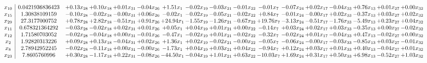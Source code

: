 \documentclass[9pt]{article}
\begin{document}
 \[\begin{array}{c| c c@{\hskip 2pt} c@{\hskip 2pt} c@{\hskip 2pt} c@{\hskip 2pt} c@{\hskip 2pt} c@{\hskip 2pt} c@{\hskip 2pt} c@{\hskip 2pt} c@{\hskip 2pt} c@{\hskip 2pt} c@{\hskip 2pt} c@{\hskip 2pt} c@{\hskip 2pt} c@{\hskip 2pt} c@{\hskip 2pt} }
 x_{10}   &  0.0421936836423 & +  0.13 x_{28} & +  0.10 x_{18} & +  0.01 x_{31} & -0.04 x_{26} & +  1.51 x_{1} & -0.02 x_{19} & -0.03 x_{21} & -0.01 x_{22} & -0.01 x_{7} & -0.07 x_{24} & +  0.02 x_{17} & -0.04 x_{33} & +  0.76 x_{13} & +  0.01 x_{27} & +  0.00 x_{32}\\
 x_{15}   &  1.30838109159 & -0.10 x_{28} & -0.02 x_{18} & -0.00 x_{31} & +  0.06 x_{26} & -0.02 x_{1} & -0.02 x_{19} & -0.05 x_{21} & -0.02 x_{22} & +  0.84 x_{7} & -0.01 x_{24} & -0.00 x_{17} & +  0.02 x_{33} & -0.37 x_{13} & +  0.03 x_{27} & +  0.02 x_{32}\\
 x_{29}   &  27.3177000752 & +  0.78 x_{28} & +  2.82 x_{18} & -0.51 x_{31} & +  0.91 x_{26} & + 24.94 x_{1} & -1.55 x_{19} & -1.26 x_{21} & -0.67 x_{22} & + 19.76 x_{7} & -3.13 x_{24} & -0.51 x_{17} & -1.76 x_{33} & -5.49 x_{13} & +  0.23 x_{27} & +  0.04 x_{32}\\
 x_{11}   &  0.678321364292 & -0.03 x_{28} & -0.02 x_{18} & +  0.02 x_{31} & +  0.01 x_{26} & +  0.05 x_{1} & +  0.04 x_{19} & +  0.01 x_{21} & +  0.00 x_{22} & -0.14 x_{7} & +  0.03 x_{24} & +  0.02 x_{17} & +  0.03 x_{33} & -0.35 x_{13} & +  0.00 x_{27} & -0.02 x_{32}\\
 x_{12}   &  1.71580703052 & -0.02 x_{28} & -0.04 x_{18} & +  0.00 x_{31} & -0.01 x_{26} & -0.47 x_{1} & -0.02 x_{19} & +  0.01 x_{21} & -0.02 x_{22} & -0.32 x_{7} & -0.02 x_{24} & +  0.01 x_{17} & -0.04 x_{33} & +  0.47 x_{13} & -0.02 x_{27} & +  0.00 x_{32}\\
 x_{2}   &  1.92820313226 & +  0.09 x_{28} & +  0.13 x_{18} & -0.04 x_{31} & +  0.02 x_{26} & +  1.36 x_{1} & +  0.02 x_{19} & -0.02 x_{21} & -0.00 x_{22} & -0.05 x_{7} & -0.06 x_{24} & -0.00 x_{17} & -0.03 x_{33} & -0.85 x_{13} & +  0.03 x_{27} & -0.01 x_{32}\\
 x_{8}   &  2.78942952245 & -0.02 x_{28} & -0.11 x_{18} & +  0.00 x_{31} & -0.00 x_{26} & -1.73 x_{1} & +  0.04 x_{19} & +  0.03 x_{21} & +  0.04 x_{22} & -0.94 x_{7} & +  0.12 x_{24} & +  0.03 x_{17} & +  0.01 x_{33} & +  0.40 x_{13} & -0.04 x_{27} & +  0.01 x_{32}\\
 x_{23}   &  7.8605760996 & +  0.30 x_{28} & -1.17 x_{18} & +  0.22 x_{31} & -0.08 x_{26} & -44.50 x_{1} & -0.04 x_{19} & +  1.01 x_{21} & +  0.63 x_{22} & -10.03 x_{7} & +  1.69 x_{24} & +  0.31 x_{17} & +  0.50 x_{33} & +  6.98 x_{13} & -0.52 x_{27} & +  1.03 x_{32}\\

\end{array}\]
\end{document}
